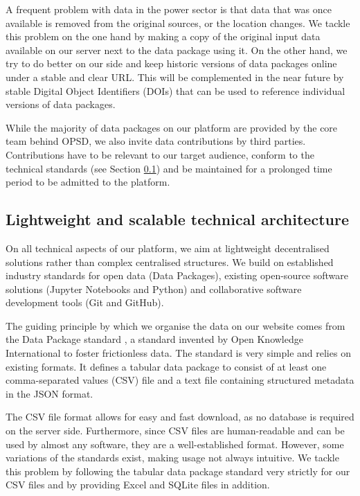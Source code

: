 \documentclass[article,sort&compress]{elsarticle}
\begin{document}
A frequent problem with data in the power sector is that data that was once available is removed from the original sources, or the location changes. We tackle this problem on the one hand by making a copy of the original input data available on our server next to the data package using it. On the other hand, we try to do better on our side and keep historic versions of data packages online under a stable and clear URL. This will be complemented in the near future by stable Digital Object Identifiers (DOIs) that can be used to reference individual versions of data packages.

While the majority of data packages on our platform are provided by the core team behind OPSD, we also invite data contributions by third parties. Contributions have to be relevant to our target audience, conform to the technical standards (see Section \ref{subsec:technical}) and be maintained for a prolonged time period to be admitted to the platform.

\subsection{Lightweight and scalable technical architecture}
\label{subsec:technical}

On all technical aspects of our platform, we aim at lightweight decentralised solutions rather than complex centralised structures. We build on established industry standards for open data (Data Packages), existing open-source software solutions (Jupyter Notebooks and Python) and collaborative software development tools (Git and GitHub).

The guiding principle by which we organise the data on our website comes from the Data Package standard \cite{OKI}, a standard invented by Open Knowledge International to foster frictionless data. The standard is very simple and relies on existing formats. It defines a tabular data package to consist of at least one comma-separated values (CSV) file and a text file containing structured metadata in the JSON format. 

The CSV file format allows for easy and fast download, as no database is required on the server side. Furthermore, since CSV files are human-readable and can be used by almost any software, they are a well-established format. However, some variations of the standards exist, making usage not always intuitive. We tackle this problem by following the tabular data package standard very strictly for our CSV files and by providing Excel and SQLite files in addition.
\end{document}
